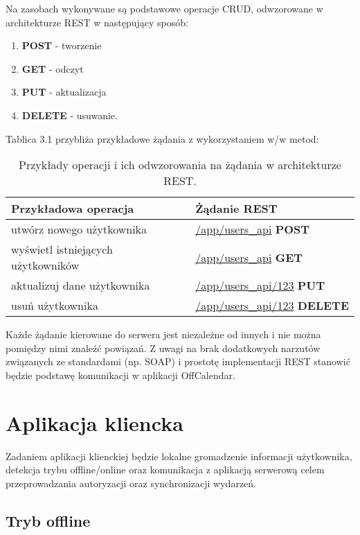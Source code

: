 Na zasobach wykonywane są podstawowe operacje CRUD, odwzorowane w architekturze REST w następujący sposób:

\begin{enumerate}
\item\textbf{POST} - tworzenie
\item \textbf{GET} - odczyt
\item \textbf{PUT} - aktualizacja
\item \textbf{DELETE} - usuwanie.
\end{enumerate}

Tablica 3.1 przybliża przykładowe żądania z wykorzystaniem w/w metod\cite{rest2}:

\begin{table}[h]
\centering
    \begin{tabular}{ | p{7cm} | p{7cm} | }
    \hline
    \textbf{Przykładowa operacja} & \textbf{Żądanie REST} \\ \hline
	utwórz nowego użytkownika & \url{/app/users_api} \textbf{POST}
	\\ \hline
	wyświetl istniejących użytkowników & \url{/app/users_api} \textbf{GET}
	\\ \hline
	aktualizuj dane użytkownika & \url{/app/users_api/123} \textbf{PUT}
	\\ \hline
	usuń użytkownika & \url{/app/users_api/123} \textbf{DELETE}
	\\ \hline
    \end{tabular}
	\caption{Przykłady operacji i ich odwzorowania na żądania w architekturze REST.}
\end{table}

Każde żądanie kierowane do serwera jest niezależne od innych i nie można pomiędzy nimi znaleźć powiązań. Z uwagi na brak dodatkowych narzutów związanych ze standardami (np. SOAP) i prostotę implementacji REST stanowić będzie podstawę komunikacji w aplikacji OffCalendar\cite{rest3}\cite{rest4}.

\section{Aplikacja kliencka}
\label{sec:appKliencka}

Zadaniem aplikacji klienckiej będzie lokalne gromadzenie informacji użytkownika, detekcja trybu offline/online oraz komunikacja z aplikacją serwerową celem przeprowadzania autoryzacji oraz synchronizacji wydarzeń.

\subsection{Tryb offline}
\label{trybOff}

